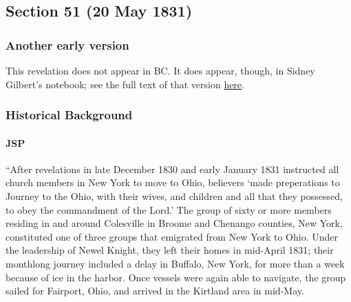 \subsection{Section 51 (20 May 1831)}
	\label{DC51}
	
	\subsubsection{Another early version}
	
		This revelation does not appear in BC. It does appear, though, in Sidney Gilbert's notebook; see the full text of that version \hyperref[EXSS-DC50-EARLY-GILBERT]{here}.
	
	\subsubsection{Historical Background}
		\label{DC51-HB}
		
		\paragraph{JSP}
		
			``After revelations in late December 1830 and early January 1831 instructed all church members in New York to move to Ohio, believers `made preperations to Journey to the Ohio, with their wives, and children and all that they possessed, to obey the commandment of the Lord.' The group of sixty or more members residing in and around Colesville in Broome and Chenango counties, New York, constituted one of three groups that emigrated from New York to Ohio. Under the leadership of Newel Knight, they left their homes in mid-April 1831; their monthlong journey included a delay in Buffalo, New York, for more than a week because of ice in the harbor. Once vessels were again able to navigate, the group sailed for Fairport, Ohio, and arrived in the Kirtland area in mid-May.
			
